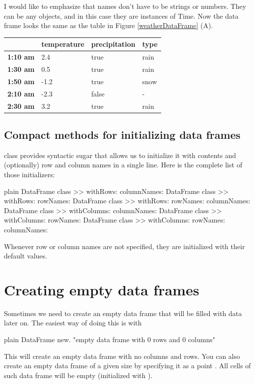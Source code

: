 \documentclass[10pt,twoside,english]{_support/latex/sbabook/sbabook}
\begin{document}
I would like to emphasize that names don't have to be strings or numbers. They can be any objects, and in this case they are instances of Time. Now the data frame looks the same as the table in Figure \ref{weatherDataFrame} (A).

\begin{tabular}{llll}
\toprule
 & \textbf{temperature} & \textbf{precipitation} & \textbf{type} \\
\midrule
\textbf{1:10 am} & 2.4 & true & rain \\
\textbf{1:30 am} & 0.5 & true & rain \\
\textbf{1:50 am} & -1.2 & true & snow \\
\textbf{2:10 am} & -2.3 & false & - \\
\textbf{2:30 am} & 3.2 & true & rain \\
\bottomrule
\end{tabular}
\subsection{Compact methods for initializing data frames}
 class provides syntactic sugar that allows us to initialize it with contents and (optionally) row and column names in a single line. Here is the complete list of those initializers:

\begin{displaycode}{plain}
DataFrame class >> withRows: columnNames:
DataFrame class >> withRows: rowNames:
DataFrame class >> withRows: rowNames: columnNames:
DataFrame class >> withColumns: columnNames:
DataFrame class >> withColumns: rowNames:
DataFrame class >> withColumns: rowNames: columnNames:
\end{displaycode}

Whenever row or column names are not specified, they are initialized with their default values.
\section{Creating empty data frames}
Sometimes we need to create an empty data frame that will be filled with data later on. The easiest way of doing this is with

\begin{displaycode}{plain}
DataFrame new. "empty data frame with 0 rows and 0 columns"
\end{displaycode}

This will create an empty data frame with no columns and rows. You can also create an empty data frame of a given size by specifying it as a point . All cells of such data frame will be empty (initialized with ).
\end{document}

